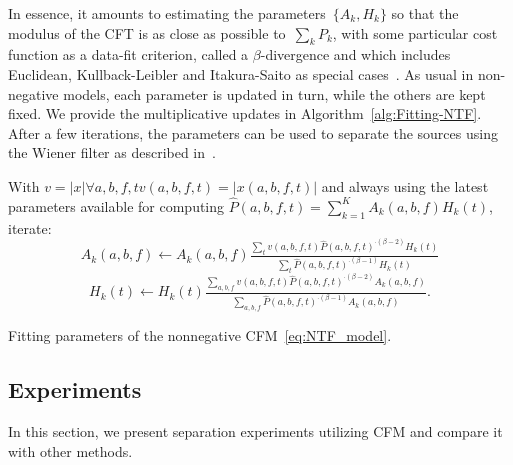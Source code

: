 In essence, it amounts to estimating the parameters~$\{ A_{k},H_{k}\} $
so that the modulus of the CFT is
as close as possible to~$\sum_{k}P_{k}$, with some particular
cost function as a data-fit criterion, called a $\beta$-divergence
and which includes Euclidean, Kullback-Leibler and Itakura-Saito as
special cases~\cite{fitzgerald08a}. As usual in non-negative models,
each parameter is updated in turn, while the others are kept fixed.
We provide the multiplicative updates in Algorithm~\ref{alg:Fitting-NTF}.
After a few iterations, the parameters can be used to separate the sources using the Wiener filter as described in~\cite{liutkus15}.

\begin{algorithm}
With $v=\left|x\right| \forall a,b,f,t v(a,b,f,t) = |x(a,b,f,t)|$ and always using the latest
parameters available for computing
 $\hat{P}\left(a,b,f,t\right)=\sum\limits_{k=1}^{K}A_{k}\left(a,b,f\right)H_{k}\left(t\right)$,
iterate:
\[
A_{k}\left(a,b,f\right)\leftarrow A_{k}\left(a,b,f\right)\tfrac{\sum_{t}v\left(a,b,f,t\right)\hat{P}\left(a,b,f,t\right)^{\cdot\left(\beta-2\right)}H_{k}\left(t\right)}{\sum_{t}\hat{P}\left(a,b,f,t\right)^{\cdot\left(\beta-1\right)}H_{k}\left(t\right)}
\]
\[
H_{k}\left(t\right)\leftarrow H_{k}\left(t\right)\tfrac{\sum_{a,b,f}v\left(a,b,f,t\right)\hat{P}\left(a,b,f,t\right)^{\cdot\left(\beta-2\right)}A_{k}\left(a,b,f\right)}{\sum_{a,b,f}\hat{P}\left(a,b,f,t\right)^{\cdot\left(\beta-1\right)}A_{k}\left(a,b,f\right)}.
\]

\caption{Fitting parameters of the nonnegative CFM~\eqref{eq:NTF_model}.\label{alg:Fitting-NTF}}
\end{algorithm}

\subsection{Experiments}
\label{sec:experiment}

In this section, we present separation experiments utilizing CFM and compare it with other methods.

